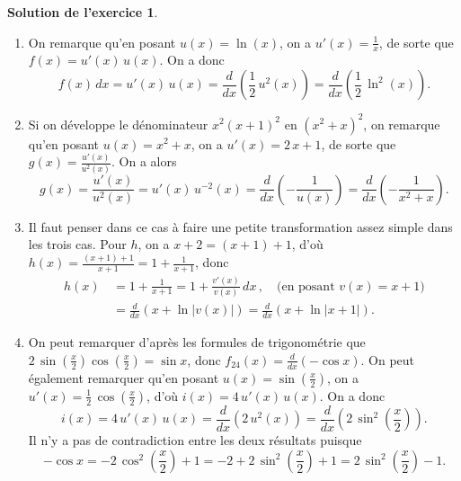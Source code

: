 \documentclass[a4paper, 11pt,openany]{article}%
\theoremstyle{plain}
\theoremstyle{definition}
\newtheorem{sol}{Solution de l'exercice}
\theoremstyle{remark}
\begin{document}
\begin{sol}
\begin{enumerate}
\item On remarque qu'en posant $u(x)= \ln (x)$, on a $u'(x)=\frac{1}{x}$, de sorte que
$f(x)=u'(x)\,u(x)$. On a donc 
\[
 f(x)\,dx= u'(x)\,u(x)=
 \frac{d}{dx} \left(\frac{1}{2}\, u^{2}(x)\right)=
\frac{d}{dx} \left( \frac{1}{2}\, \ln^{2}(x)\right).
\]
\item Si on développe le
dénominateur $x^2(x+1)^2$ en $(x^2+x)^2$, on remarque qu'en posant $u(x)=x^2+x$, on a $u'(x)=2\,x+1$, de sorte
que $g(x)=\frac{u'(x)}{u^{2}(x)}$. On a alors 
\[
g(x)= \frac{u'(x)}{u^{2}(x)}= 
u'(x)\, u^{-2}(x)=\frac{d}{dx} \left(-\frac{1}{u(x)}\right)=\frac{d}{dx} \left(-\frac{1}{x^2+x}\right).
\] 
\item Il faut penser dans ce cas à faire une petite
transformation assez simple dans les trois cas. Pour $h$, on a $
x+2=(x+1)+1$, d'où $h(x)=\frac{(x+1)+1}{x+1}=1+\frac{1}{x+1}$,
donc
\begin{align*}
h(x)\, &=  1+\frac{1}{x+1}=1+ \frac{v'(x)}{v(x)}\,dx\,,\quad \text{(en posant $v(x)=x+1$)}\\
&= \frac{d}{dx} \left(x+\ln |v(x)|\right)= \frac{d}{dx}\left(x+\ln |x+1|\right).
\end{align*}
\item On peut remarquer d'après les formules de trigonométrie que $2\,\sin(\frac{x}{2})\cos(\frac{x}{2})=\sin x$, donc
$ f_{24}(x) =  \frac{d}{dx}\left(-\cos x \right)$. On peut également remarquer qu'en posant
 $u(x)=\sin(\frac{x}{2})$, on a $u'(x)=\frac{1}{2}\, \cos(\frac{x}{2})$,
d'où $i(x)=4\,u'(x)\, u(x)$. On a donc
\[
i (x)= 4\,  u'(x)\, u(x)= \frac{d}{dx}\left( 2\,u^2(x)\right)= \frac{d}{dx}\left(2\,\sin^{2}\left(\frac{x}{2}\right)\right).
\]
Il n'y a pas de contradiction entre les deux résultats puisque
\[
-\cos x = -2\, \cos^{2}\left(\frac{x}{2}\right)+1
= -2+2\,\sin^2\left(\frac{x}{2}\right)+1
=2\,\sin^{2}\left(\frac{x}{2}\right)-1.
\]
\end{enumerate}
\end{sol}
\end{document}
